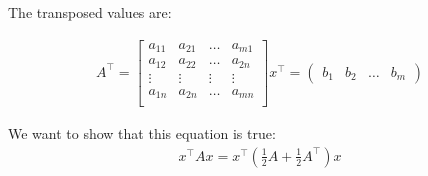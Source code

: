 \documentclass[12pt]{article}
\begin{document}
\begin{enumerate}
    The transposed values are:

    \begin{align*} 
        A^\intercal = 
        \begin{bmatrix}
            a_{11}    &   a_{21}    & \dots     &   a_{m1}    \\
            a_{12}    &   a_{22}    & \dots     &   a_{2n}    \\
            \vdots    &  \vdots     & \vdots    &   \vdots    \\   
            a_{1n}    &   a_{2n}    & \dots     &   a_{mn}    \\
        \end{bmatrix}
        x^\intercal = 
        \begin{pmatrix}
            b_1     &
            b_2     &
            \dots  &
            b_m
        \end{pmatrix}
    \end{align*}

    We want to show that this equation is true:
    \begin{align*} 
        x^\intercal Ax = x^\intercal ( \frac{1}{2} A + \frac{1}{2} A^\intercal )x
    \end{align*}


\end{enumerate}
\end{document}
